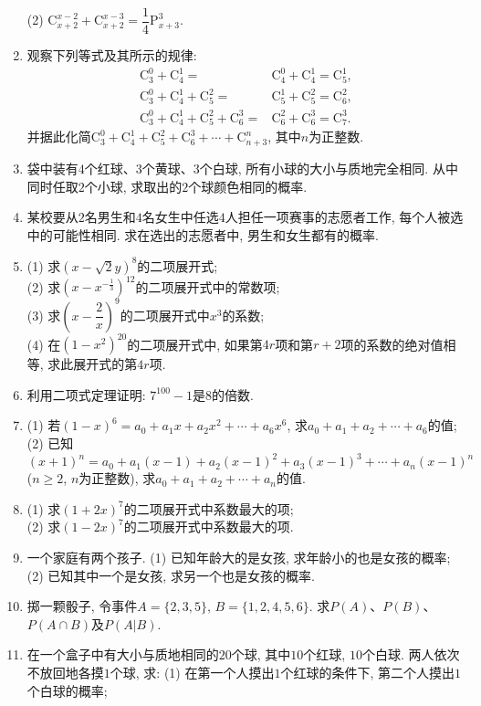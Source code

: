 \documentclass[10pt,a4paper]{article}
\begin{document}
\begin{enumerate}[1.]
(2) $\mathrm{C}_{x+2}^{x-2}+\mathrm{C}_{x+2}^{x-3}=\dfrac 14\mathrm{P}_{x+3}^3$.
\item 观察下列等式及其所示的规律:\\
\begin{align*}
\mathrm{C}_3^0+\mathrm{C}_4^1=&\mathrm{C}_4^0+\mathrm{C}_4^1=\mathrm{C}_5^1,\\
\mathrm{C}_3^0+\mathrm{C}_4^1+\mathrm{C}_5^2=&\mathrm{C}_5^1+\mathrm{C}_5^2=\mathrm{C}_6^2,\\
\mathrm{C}_3^0+\mathrm{C}_4^1+\mathrm{C}_5^2+\mathrm{C}_6^3=&\mathrm{C}_6^2+\mathrm{C}_6^3=\mathrm{C}_7^3.
\end{align*}
并据此化简$\mathrm{C}_3^0+\mathrm{C}_4^1+\mathrm{C}_5^2+\mathrm{C}_6^3+\cdots+\mathrm{C}_{n+3}^n$, 其中$n$为正整数.
\item 袋中装有$4$个红球、$3$个黄球、$3$个白球, 所有小球的大小与质地完全相同. 从中同时任取$2$个小球, 求取出的$2$个球颜色相同的概率.
\item 某校要从$2$名男生和$4$名女生中任选$4$人担任一项赛事的志愿者工作, 每个人被选中的可能性相同. 求在选出的志愿者中, 男生和女生都有的概率.
\item (1) 求$(x-\sqrt2y)^8$的二项展开式;\\
(2) 求$(x-x^{-\frac 13})^{12}$的二项展开式中的常数项;\\
(3) 求$(x-\dfrac 2x)^9$的二项展开式中$x^3$的系数;\\
(4) 在$(1-x^2)^{20}$的二项展开式中, 如果第$4r$项和第$r+2$项的系数的绝对值相等, 求此展开式的第$4r$项.
\item 利用二项式定理证明: $7^{100}-1$是$8$的倍数. 
\item (1) 若$(1-x)^6=a_0+a_1x+a_2x^2+\cdots+a_6x^6$, 求$a_0+a_1+a_2+\cdots+a_6$的值;\\
(2) 已知$(x+1)^n=a_0+a_1(x-1)+a_2(x-1)^2+a_3(x-1)^3+\cdots+a_n(x-1)^n$($n\ge 2$, $n$为正整数), 求$a_0+a_1+a_2+\cdots+a_n$的值.
\item (1) 求$(1+2x)^7$的二项展开式中系数最大的项;\\
(2) 求$(1-2x)^7$的二项展开式中系数最大的项. 
\item 一个家庭有两个孩子.
(1) 已知年龄大的是女孩, 求年龄小的也是女孩的概率;
(2) 已知其中一个是女孩, 求另一个也是女孩的概率.
\item 掷一颗骰子, 令事件$A=\{2,3,5\}$, $B=\{1,2,4,5,6\}$. 求$P(A)$、$P(B)$、$P(A\cap B)$及$P(A|B)$.
\item 在一个盒子中有大小与质地相同的$20$个球, 其中$10$个红球, $10$个白球. 两人依次不放回地各摸$1$个球, 求:
(1) 在第一个人摸出$1$个红球的条件下, 第二个人摸出$1$个白球的概率;\\

\end{enumerate}
\end{document}
